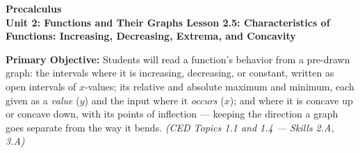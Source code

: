 \documentclass[10pt]{article}
\newcommand{\CourseName}{Precalculus}
\newcommand{\UnitNumberName}{Unit 2: Functions and Their Graphs \quad}
\newcommand{\LessonNumberName}{Lesson 2.5: Characteristics of Functions: Increasing, Decreasing, Extrema, and Concavity}
\begin{document}
\begin{center}
    {\Large\bfseries \CourseName \\
    {\small\bfseries \UnitNumberName \LessonNumberName}}
\end{center}

\begin{tcolorbox}[colback=lilac, colframe=plum, boxrule=0.9pt, arc=2mm,
    left=2mm, right=2mm, top=1.5mm, bottom=1.5mm]
    \textbf{Primary Objective:} Students will read a function's behavior from a pre-drawn
    graph: the intervals where it is increasing, decreasing, or constant, written as open
    intervals of $x$-values; its relative and absolute maximum and minimum, each given as a
    \textit{value} ($y$) and the input where it \textit{occurs} ($x$); and where it is concave
    up or concave down, with its points of inflection --- keeping the direction a graph goes
    separate from the way it bends.
    \hfill\textit{\small (CED Topics 1.1 and 1.4 --- Skills 2.A, 3.A)}
\end{tcolorbox}
\end{document}
